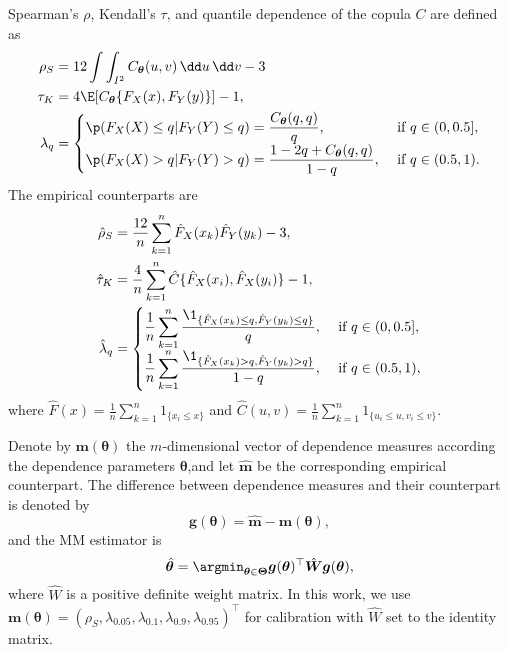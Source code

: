 Spearman's $\rho$, Kendall's $\tau$, and quantile dependence of the copula $C$ are defined as
\begin{align*}
  \rho_S &= 12 \int\int_{I^2} C_{\bm{\theta}}(u,v)\, \dd u\, \dd v-3\label{eq:rho_S}\\
  \tau_K &= 4\E[C_{\bm{\theta}}\{F_X(x), F_Y(y)\}]-1,\\
  \lambda_q &=
  \begin{cases}
    \p(F_X(X)\leq q| F_Y(Y)\leq q) = \displaystyle \frac{C_{\bm{\theta}}(q,q)}{q},
    &\text{ if } q\in (0,0.5],\\
    \p(F_X(X)>q|F_Y(Y)>q) =\displaystyle \frac{1-2q+C_{\bm{\theta}}(q,q)} {1-q},
    &\text{ if } q\in (0.5,1).
  \end{cases}
\end{align*}
The empirical counterparts are
\begin{align*}
  \hat\rho_S &= \frac{12}{n} \sum_{k=1}^n \hat F_X(x_k) \hat F_Y(y_k)
               -3,\\
  \hat\tau_K &= \frac{4}{n}\sum_{k=1}^n \hat{C}\{\hat{F}_X(x_i),\hat{F}_X(y_i)\} -1 ,\\
  \hat\lambda_q &=
                  \begin{cases}
                    \displaystyle\frac{1}{n} \sum_{k=1}^n \frac{\1_{\{\hat
                        F_X(x_k)\leq q, \hat F_Y(y_k)\leq q\}}} {q},
                    &\text { if } q\in (0, 0.5],\\
                    \displaystyle \frac{1}{n} \sum_{k=1}^n
                    \frac{\1_{\{\hat F_X(x_k)>q, \hat F_Y(y_k)>q\}}}
                    {1-q}, &\text { if } q\in (0.5,1),
                  \end{cases}
\end{align*}
where $\displaystyle \hat{F}(x) =
  \frac{1}{n}\sum_{k=1}^n 1_{\{x_i\leq x\}}$ and
$\displaystyle \hat{C}(u,v) = \frac{1}{n}\sum_{k=1}^n 1_{\{u_i\leq u, v_i\leq v\}}$. 

Denote by $\bm{m}(\bm{\theta})$ the $m$-dimensional vector of
dependence measures according the dependence parameters
$\bm{\theta}$,and let $\hat{\bm{m}}$ be the corresponding empirical
counterpart. 
The difference between dependence measures and their counterpart is denoted by
\begin{equation*}
    \bm{g}(\bm{\theta}) = \hat{\bm{m}} - \bm{m}(\bm{\theta}),
\end{equation*}
and the MM estimator is
\begin{equation*}
    \hat{\bm{\theta}} = \argmin_{\bm{\theta}\in \bm{\Theta}} \bm{g}(\bm{\theta})^\top
    \hat{\bm{W}}
     \bm{g}(\bm{\theta}),
\end{equation*}
where $\hat{W}$ is a positive definite weight matrix.
In this work, we use
$\bm{m}(\bm{\theta}) = (\rho_S, \lambda_{0.05}, \lambda_{0.1}, 
\lambda_{0.9}, \lambda_{0.95})^\top$
for calibration with 
$\hat{W}$ set to the identity matrix. 

